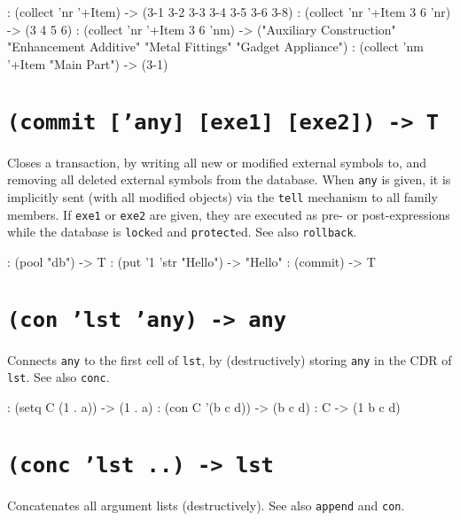 \begin{wideverbatim}
: (collect 'nr '+Item)
-> ({3-1} {3-2} {3-3} {3-4} {3-5} {3-6} {3-8})
: (collect 'nr '+Item 3 6 'nr)
-> (3 4 5 6)
: (collect 'nr '+Item 3 6 'nm)
-> ("Auxiliary Construction" "Enhancement Additive" "Metal Fittings" "Gadget Appliance")
: (collect 'nm '+Item "Main Part")
-> ({3-1})
\end{wideverbatim}

 
\section*{\texttt{(commit ['any] [exe1] [exe2]) -> T}}
\label{sec:funct-rec-C-(commit-['any]-[exe1]-[exe2])-->-t}


Closes a transaction, by writing all new or modified external symbols
to, and removing all deleted external symbols from the database. When
\texttt{any} is given, it is implicitly sent (with all modified objects) via
the \texttt{tell} mechanism to all family members. If \texttt{exe1} or \texttt{exe2} are
given, they are executed as pre- or post-expressions while the database
is \texttt{lock}ed and \texttt{protect}ed. See also \texttt{rollback}.


\begin{wideverbatim}
: (pool "db")
-> T
: (put '{1} 'str "Hello")
-> "Hello"
: (commit)
-> T
\end{wideverbatim}

 
\section*{\texttt{(con 'lst 'any) -> any}}
\label{sec:funct-rec-C-(con-'lst-'any)-->-any}


Connects \texttt{any} to the first cell of \texttt{lst}, by (destructively) storing
\texttt{any} in the CDR of \texttt{lst}. See also \texttt{conc}.


\begin{wideverbatim}
: (setq C (1 . a))
-> (1 . a)
: (con C '(b c d))
-> (b c d)
: C
-> (1 b c d)
\end{wideverbatim}

 
\section*{\texttt{(conc 'lst ..) -> lst}}
\label{sec:funct-rec-C-(conc-'lst-..)-->-lst}


Concatenates all argument lists (destructively). See also \texttt{append} and
\texttt{con}.


